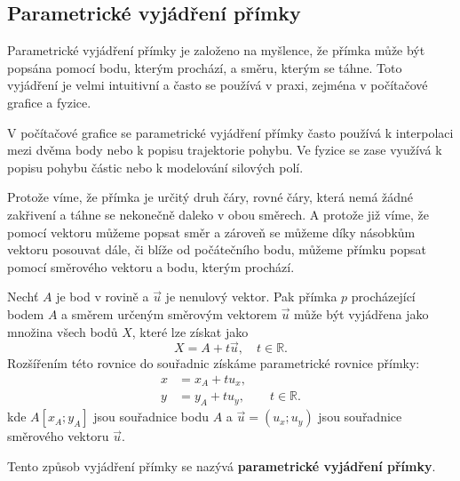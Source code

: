 \subsection{Parametrické vyjádření přímky}
\label{subsec:Parametric_line}

Parametrické vyjádření přímky je založeno na myšlence,
že přímka může být popsána pomocí bodu, kterým prochází, a směru, kterým se táhne.
Toto vyjádření je velmi intuitivní a často se používá v praxi,
zejména v počítačové grafice a fyzice.

\begin{remark}
    V počítačové grafice se parametrické vyjádření přímky často používá k 
    interpolaci mezi dvěma body nebo k popisu trajektorie pohybu.
    Ve fyzice se zase využívá k popisu pohybu částic nebo k modelování silových polí.
\end{remark}

Protože víme, že přímka je určitý druh čáry, rovné čáry, která 
nemá žádné zakřivení a táhne se nekonečně daleko v obou směrech.
A protože již víme, že pomocí vektoru můžeme popsat směr a zároveň
se můžeme díky násobkům vektoru posouvat dále, či blíže od počátečního bodu,
můžeme přímku popsat pomocí směrového vektoru a bodu, kterým prochází.

\begin{definition}\label{def:Parametric_line}
    Nechť $A$ je bod v rovině a $\vec{u}$ je nenulový vektor.
    Pak přímka $p$ procházející bodem $A$ a směrem určeným směrovým vektorem $\vec{u}$ může být vyjádřena jako množina všech bodů $X$, které lze získat jako
    \begin{equation}
        X = A + t\vec{u}, \quad t \in \mathbb{R}.
    \end{equation}
    Rozšířením této rovnice do souřadnic získáme parametrické rovnice přímky:
    \begin{equation}
        \begin{aligned}
            x &= x_A + t u_x, \\
            y &= y_A + t u_y,
            \qquad t \in \mathbb{R}.
        \end{aligned}
        \label{eq:Parametric_line_coordinate_form}
    \end{equation}
    kde $A[x_A; y_A]$ jsou souřadnice bodu $A$ a $\vec{u} = (u_x; u_y)$ jsou souřadnice směrového vektoru $\vec{u}$.

    Tento způsob vyjádření přímky se nazývá \textbf{parametrické vyjádření přímky}.
\end{definition}

